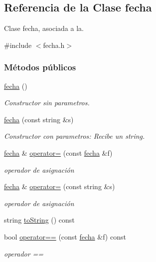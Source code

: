 \hypertarget{classfecha}{\subsection{Referencia de la Clase fecha}
\label{classfecha}
}


Clase fecha, asociada a la.  




{\ttfamily \#include $<$fecha.\+h$>$}

\subsubsection*{Métodos públicos}
\begin{DoxyCompactItemize}
\item 
\hyperlink{classfecha_a6775ef84b5838e12e28fd341793f4539}{fecha} ()
\begin{DoxyCompactList}\small\item\em Constructor sin parametros. \end{DoxyCompactList}\item 
\hyperlink{classfecha_aed5c22d5eeb15f1f2927d5a2c28b74df}{fecha} (const string \&s)
\begin{DoxyCompactList}\small\item\em Constructor con parametros\+: Recibe un string. \end{DoxyCompactList}\item 
\hyperlink{classfecha}{fecha} \& \hyperlink{classfecha_ac7f5398b71cbccc4cd74f8c5e56b80ce}{operator=} (const \hyperlink{classfecha}{fecha} \&f)
\begin{DoxyCompactList}\small\item\em operador de asignación \end{DoxyCompactList}\item 
\hyperlink{classfecha}{fecha} \& \hyperlink{classfecha_adf0cb1494d557581d89e3289ab121bc5}{operator=} (const string \&s)
\begin{DoxyCompactList}\small\item\em operador de asignación \end{DoxyCompactList}\item 
string \hyperlink{classfecha_a26d22b980284408eac0da084f358c43b}{to\+String} () const 
\item 
bool \hyperlink{classfecha_ac971e131a6e3edf57c2313468524f364}{operator==} (const \hyperlink{classfecha}{fecha} \&f) const 
\begin{DoxyCompactList}\small\item\em operador == \end{DoxyCompactList}\item 

\end{DoxyCompactItemize}
